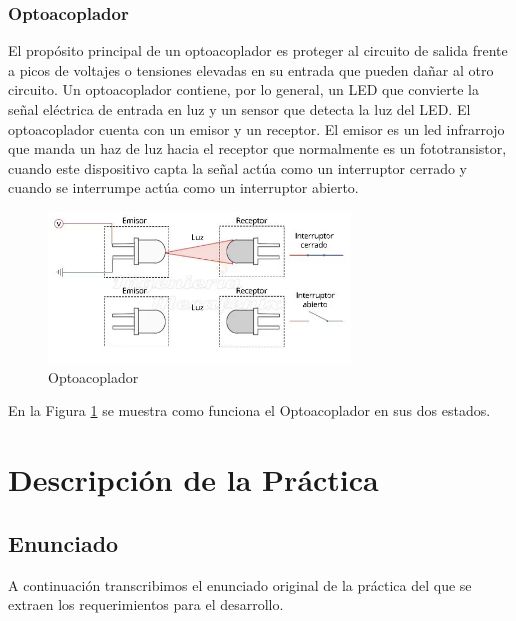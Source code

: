 \documentclass[a4paper]{article}
\begin{document}
\subsubsection*{Optoacoplador}

El propósito principal de un optoacoplador es proteger al circuito de salida frente a picos de voltajes o tensiones elevadas en su entrada que pueden dañar al otro circuito. Un optoacoplador contiene, por lo general, un LED que convierte la señal eléctrica de entrada en luz y un sensor que detecta la luz del LED.
El optoacoplador cuenta con un emisor y un receptor. El emisor es un led infrarrojo que manda un haz de luz hacia el receptor que normalmente es un fototransistor, cuando este dispositivo capta la señal actúa como un interruptor cerrado y cuando se interrumpe actúa como un interruptor abierto.

\begin{figure}[h]\centering
    \includegraphics[height=4cm]{Optoacoplador.png}
    \caption{Optoacoplador}
    \label{fig:Optoacoplador}
\end{figure}

En la Figura \ref{fig:Optoacoplador} se muestra como funciona el Optoacoplador en sus dos estados.

\section{Descripción de la Práctica}

\subsection{Enunciado}

A continuación transcribimos el enunciado original de la práctica del
que se extraen los requerimientos para el desarrollo.
\end{document}
